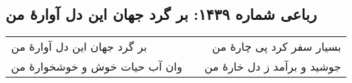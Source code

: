\begin{center}
\section*{رباعی شماره ۱۴۳۹: بر گرد جهان این دل آوارهٔ من}
\label{sec:1439}
\begin{longtable}{l p{0.5cm} r}
بر گرد جهان این دل آوارهٔ من
&&
بسیار سفر کرد پی چارهٔ من
\\
وان آب حیات خوش و خوشخوارهٔ من
&&
جوشید و برآمد ز دل خارهٔ من
\\
\end{longtable}
\end{center}

